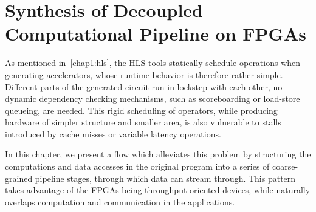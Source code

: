 \chapter{Synthesis of Decoupled Computational Pipeline on FPGAs}
\label{decoupleChap}
As mentioned in~\ref{chap1:hls}, the HLS tools statically schedule
operations when generating accelerators, whose runtime behavior
is therefore rather simple. Different parts
of the generated circuit run in lockstep with each other, no dynamic dependency checking mechanisms,
such as scoreboarding or load-store queueing, are needed.
This rigid scheduling of operators, while producing hardware of simpler structure and smaller area,
is also vulnerable to stalls introduced by cache misses or variable latency operations.

In this chapter, we present a flow which alleviates this problem by structuring the
computations and data accesses in the original program into a series of coarse-grained pipeline stages, through which data can stream through. This pattern takes advantage
of the FPGAs being throughput-oriented devices, while naturally overlaps computation and
communication in the applications.


